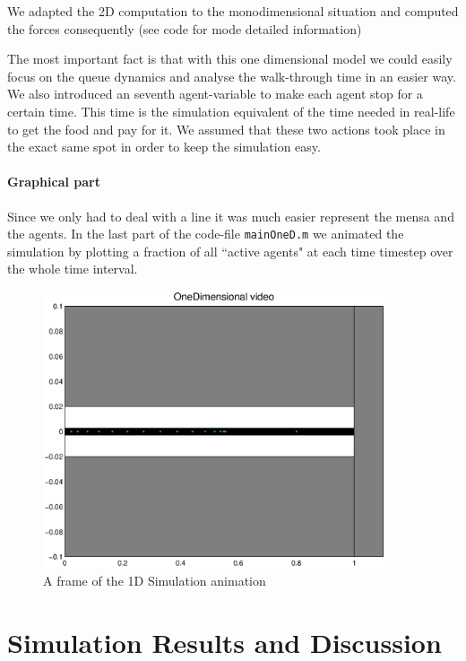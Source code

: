 \documentclass[11pt]{article}
\begin{document}
We adapted the 2D computation to the monodimensional situation and computed the forces consequently (see code for mode detailed information)

The most important fact is that with this one dimensional model we could easily focus on the queue dynamics and analyse the walk-through time in an easier way. We also introduced an seventh agent-variable to make each agent stop for a certain time. This time is the simulation equivalent of the time needed in real-life to get the food and pay for it. We assumed that these two actions took place in the exact same spot in order to keep the simulation easy.

\paragraph{Graphical part} 
Since we only had to deal with a line it was much easier represent the mensa and the agents. In the last part of the code-file \verb"mainOneD.m" we animated the simulation by plotting a fraction of all ``active agents" at each time timestep over the whole time interval.

\begin{figure}[h]
 	\centering
		\includegraphics[width = 0.9\textwidth]{Images/RESULTS01_Stop60/oneDVideoFrame.eps}
 	\caption{A frame of the 1D Simulation animation}
  	\label{oneFrame}
\end{figure}


\section{Simulation Results and Discussion}
\end{document}
